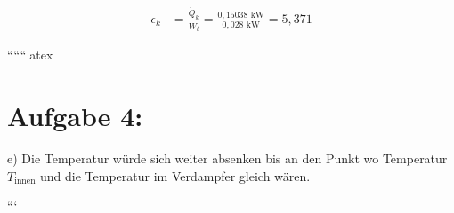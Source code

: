 \begin{align*}
\epsilon_k &= \frac{\dot{Q}_{k}}{\dot{W}_{t}} = \frac{0{,}15038 \text{ kW}}{0{,}028 \text{ kW}} = 5{,}371
\end{align*}

``````latex


\section*{Aufgabe 4:}

e) Die Temperatur würde sich weiter absenken bis an den Punkt wo Temperatur $T_{\text{innen}}$ und die Temperatur im Verdampfer gleich wären.

```